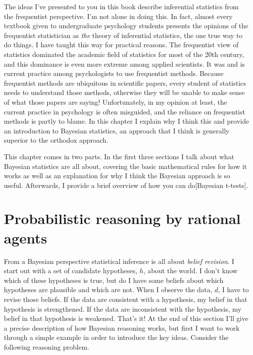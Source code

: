 \documentclass[
  a4paper,
]{book}
\begin{document}
The ideas I've presented to you in this book describe inferential
statistics from the frequentist perspective. I'm not alone in doing
this. In fact, almost every textbook given to undergraduate psychology
students presents the opinions of the frequentist statistician as
\emph{the} theory of inferential statistics, the one true way to do
things. I have taught this way for practical reasons. The frequentist
view of statistics dominated the academic field of statistics for most
of the 20th century, and this dominance is even more extreme among
applied scientists. It was and is current practice among psychologists
to use frequentist methods. Because frequentist methods are ubiquitous
in scientific papers, every student of statistics needs to understand
those methods, otherwise they will be unable to make sense of what those
papers are saying! Unfortunately, in my opinion at least, the current
practice in psychology is often misguided, and the reliance on
frequentist methods is partly to blame. In this chapter I explain why I
think this and provide an introduction to Bayesian statistics, an
approach that I think is generally superior to the orthodox approach.

This chapter comes in two parts. In the first three sections I talk
about what Bayesian statistics are all about, covering the basic
mathematical rules for how it works as well as an explanation for why I
think the Bayesian approach is so useful. Afterwards, I provide a brief
overview of how you can do{[}Bayesian t-tests{]}.

\hypertarget{probabilistic-reasoning-by-rational-agents}{%
\section{Probabilistic reasoning by rational
agents}\label{probabilistic-reasoning-by-rational-agents}}

From a Bayesian perspective statistical inference is all about
\emph{belief revision}. I start out with a set of candidate hypotheses,
\(h\), about the world. I don't know which of these hypotheses is true,
but do I have some beliefs about which hypotheses are plausible and
which are not. When I observe the data, \(d\), I have to revise those
beliefs. If the data are consistent with a hypothesis, my belief in that
hypothesis is strengthened. If the data are inconsistent with the
hypothesis, my belief in that hypothesis is weakened. That's it! At the
end of this section I'll give a precise description of how Bayesian
reasoning works, but first I want to work through a simple example in
order to introduce the key ideas. Consider the following reasoning
problem.
\end{document}
